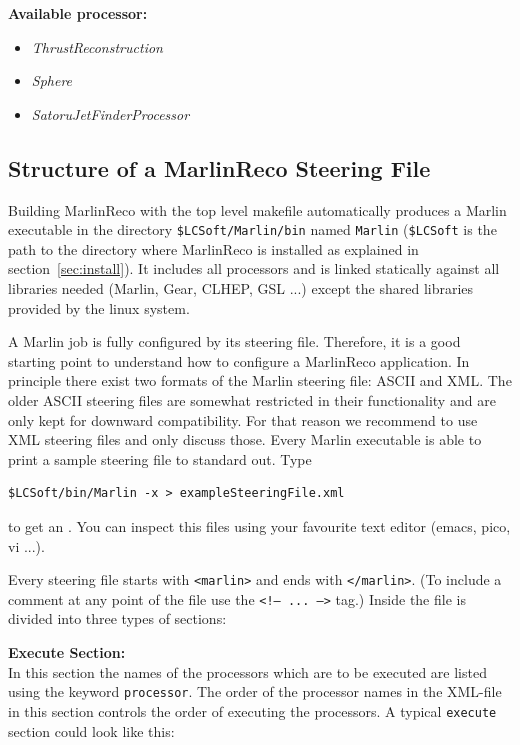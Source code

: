 {\bf Available processor:} 
\begin{itemize}
\item {\em ThrustReconstruction}
\item {\em Sphere}
\item {\em SatoruJetFinderProcessor}
\end{itemize}

\subsection{Structure of a MarlinReco Steering File}

Building MarlinReco with the top level makefile automatically produces a
Marlin executable in the directory {\tt \$LCSoft/Marlin/bin} named 
{\tt Marlin}
({\tt \$LCSoft} is the path to the directory where MarlinReco is installed as
explained in section~\ref{sec:install}).
It includes all processors and is linked statically against all 
libraries needed (Marlin, Gear, CLHEP, GSL ...) except the shared libraries
provided by the linux system. 

A Marlin job is fully configured by its steering file. 
Therefore, it is a good starting point to understand how to configure a 
MarlinReco application. 
In principle there exist two formats of the Marlin steering file: 
ASCII and XML. The older ASCII steering files are somewhat restricted in their 
functionality and are only kept for downward compatibility. For that reason 
we recommend to use XML steering files and only discuss those. 
Every Marlin executable is
able to print a sample steering file to standard out. Type

\begin{verbatim}
$LCSoft/bin/Marlin -x > exampleSteeringFile.xml
\end{verbatim}

to get an 
. You can inspect this files using your favourite
text editor (emacs, pico, vi ...). 

Every steering file starts with {\tt <marlin>} and ends with 
{\tt </marlin>}. (To include a comment at any point of the file use the 
{\tt <!-- ... -->} tag.) 
Inside the file is divided into three types of sections:

{\bf Execute Section:} \\
In this section the names of the processors which are to be 
executed are listed using the keyword {\tt processor}. 
The order of the processor names in the XML-file in this section controls the 
order of executing the processors. A typical {\tt execute} section 
could look like this:


